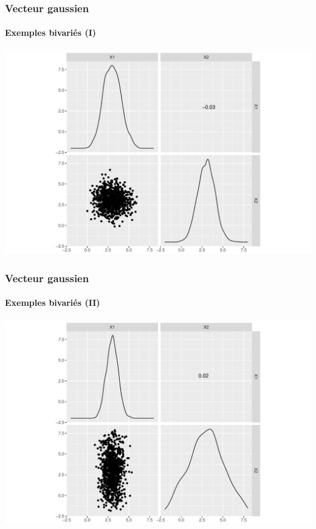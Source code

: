\documentclass{beamer}\usepackage[]{graphicx}\usepackage[]{color}
\newenvironment{knitrout}{}{} %
\begin{document}
\begin{frame}[fragile]
  \frametitle{Vecteur gaussien}
  \framesubtitle{Exemples bivariés (I)}

\begin{knitrout}\scriptsize
{}\color{fgcolor}
\includegraphics[width=\textwidth]{figures/algebra-unnamed-chunk-4-1} 

\end{knitrout}

\end{frame}

\begin{frame}[fragile]
  \frametitle{Vecteur gaussien}
  \framesubtitle{Exemples bivariés (II)}

\begin{knitrout}\scriptsize
{}\color{fgcolor}
\includegraphics[width=\textwidth]{figures/algebra-unnamed-chunk-5-1} 

\end{knitrout}

\end{frame}
\end{document}
